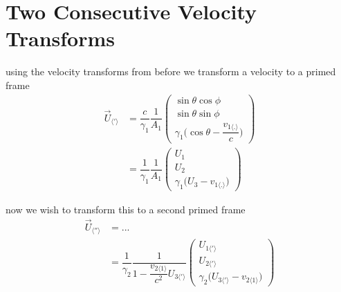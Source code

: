 \chapter{Two Consecutive Velocity Transforms}
using the velocity transforms from before we transform a velocity to a primed frame
\begin{equation}%
    \begin{split}
    \vec{U}_{\langle ' \rangle}
    &= \dfrac{c}{\gamma_1} \dfrac{1}{A_1} \begin{pmatrix}
    \sin\theta\cos\phi\\ \sin\theta\sin\phi\\ \gamma_1\Big(\cos\theta - \dfrac{v_{1\langle . \rangle}}{c}\Big)
    \end{pmatrix} \\
    &= \dfrac{1}{\gamma_1} \dfrac{1}{A_1} \begin{pmatrix}
    U_1\\ U_2\\ \gamma_1\Big(U_3 - v_{1\langle . \rangle}\Big)
    \end{pmatrix}
    \end{split}
\end{equation}%

now we wish to transform this to a second primed frame
\begin{equation}%
    \begin{split}
    \vec{U}_{\langle '' \rangle}
    &= ... \\
    &= \dfrac{1}{\gamma_2} \dfrac{1}{1-\dfrac{v_{2\langle 1 \rangle}}{c^2}U_{3\langle'\rangle}} \begin{pmatrix}
    U_{1\langle'\rangle}\\ U_{2\langle'\rangle}\\ \gamma_2\Big(U_{3\langle'\rangle} - v_{2\langle 1 \rangle} \Big)
    \end{pmatrix}
    \end{split}
\end{equation}%

